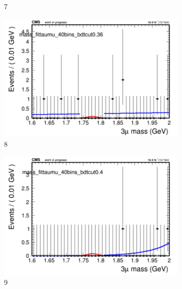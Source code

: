 \begin{figure}[h!]
\begin{subfigure}{0.2\textwidth}
        \caption{7}
    \end{subfigure}
    \begin{subfigure}{0.2\textwidth}
        \includegraphics[width=\textwidth]{unfixed_exp/plots/taumu/massfit_taumu_40bins_bdtcut0.36.png}
        \caption{8}
    \end{subfigure}
    \begin{subfigure}{0.2\textwidth}
        \includegraphics[width=\textwidth]{unfixed_exp/plots/taumu/massfit_taumu_40bins_bdtcut0.4.png}
        \caption{9}
    \end{subfigure}
    \begin{subfigure}{0.2\textwidth}

\end{subfigure}
\end{figure}
